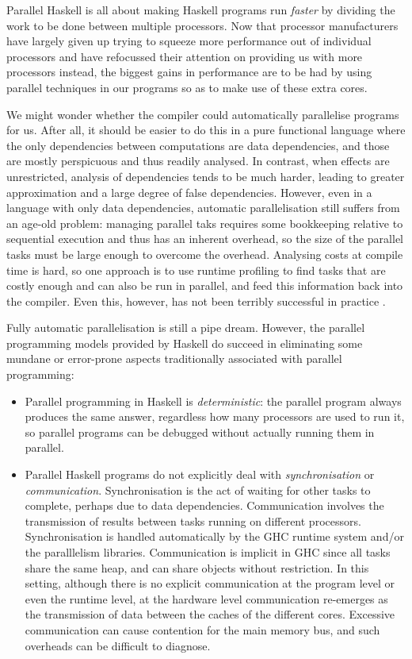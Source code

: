 
Parallel Haskell is all about making Haskell programs run
\emph{faster} by dividing the work to be done between multiple
processors.  Now that processor manufacturers have largely given up
trying to squeeze more performance out of individual processors and
have refocussed their attention on providing us with more processors
instead, the biggest gains in performance are to be had by using
parallel techniques in our programs so as to make use of these extra
cores.

We might wonder whether the compiler could automatically parallelise
programs for us.  After all, it should be easier to do this in a pure
functional language where the only dependencies between computations
are data dependencies, and those are mostly perspicuous and thus
readily analysed.  In contrast, when effects are unrestricted,
analysis of dependencies tends to be much harder, leading to greater
approximation and a large degree of false dependencies.  However, even
in a language with only data dependencies, automatic parallelisation
still suffers from an age-old problem: managing parallel taks requires
some bookkeeping relative to sequential execution and thus has an
inherent overhead, so the size of the parallel tasks must be large
enough to overcome the overhead.  Analysing costs at compile time is
hard, so one approach is to use runtime profiling to find tasks that
are costly enough and can also be run in parallel, and feed this
information back into the compiler.  Even this, however, has not been
terribly successful in practice \cite{fdip}.

Fully automatic parallelisation is still a pipe dream.  However, the
parallel programming models provided by Haskell do succeed in
eliminating some mundane or error-prone aspects traditionally
associated with parallel programming:

\begin{itemize}
\item Parallel programming in Haskell is \emph{deterministic}: the
  parallel program always produces the same answer, regardless how
  many processors are used to run it, so parallel programs can be
  debugged without actually running them in parallel.

\item Parallel Haskell programs do not explicitly deal with
  \emph{synchronisation} or \emph{communication}.  Synchronisation is
  the act of waiting for other tasks to complete, perhaps due to data
  dependencies.  Communication involves the transmission of results
  between tasks running on different processors.  Synchronisation is
  handled automatically by the GHC runtime system and/or the
  paralllelism libraries.  Communication is implicit in GHC since all
  tasks share the same heap, and can share objects without
  restriction.  In this setting, although there is no explicit
  communication at the program level or even the runtime level, at the
  hardware level communication re-emerges as the transmission of data
  between the caches of the different cores.  Excessive communication
  can cause contention for the main memory bus, and such overheads can
  be difficult to diagnose.
\end{itemize}

